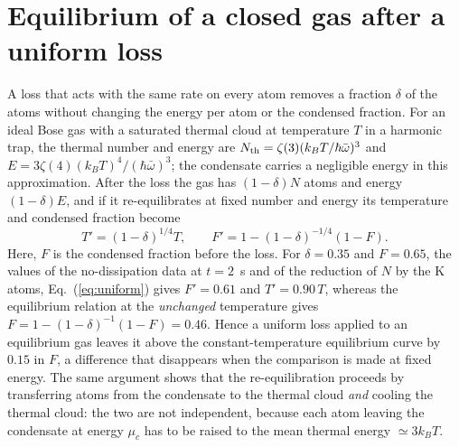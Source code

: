 \appendix
\section{Equilibrium of a closed gas after a uniform loss}
\label{app:uniform}
A loss that acts with the same rate on every atom removes a fraction $\delta$
of the atoms without changing the energy per atom or the condensed fraction.
For an ideal Bose gas with a saturated thermal cloud at temperature $T$ in a
harmonic trap, the thermal number and energy are
$N_{\rm th}=\zeta(3)(k_BT/\hbar\bar\omega)^3$ and
$E=3\zeta(4)(k_BT)^4/(\hbar\bar\omega)^3$; the condensate carries a negligible
energy in this approximation. After the loss the gas has $(1-\delta)N$ atoms
and energy $(1-\delta)E$, and if it re-equilibrates at fixed number and energy
its temperature and condensed fraction become
\begin{equation}
T'=(1-\delta)^{1/4}T,\qquad F'=1-(1-\delta)^{-1/4}(1-F).
\label{eq:uniform}
\end{equation}
Here, $F$ is the condensed fraction before the loss. For $\delta=0.35$ and
$F=0.65$, the values of the no-dissipation data at $t=2$~s and of the
reduction of $N$ by the K atoms, Eq.~(\ref{eq:uniform}) gives $F'=0.61$ and
$T'=0.90\,T$, whereas the equilibrium relation at the \emph{unchanged}
temperature gives $F=1-(1-\delta)^{-1}(1-F)=0.46$. Hence a uniform loss
applied to an equilibrium gas leaves it above the constant-temperature
equilibrium curve by $0.15$ in $F$, a difference that disappears when the
comparison is made at fixed energy. The same argument shows that the
re-equilibration proceeds by transferring atoms from the condensate to the
thermal cloud \emph{and} cooling the thermal cloud: the two are not
independent, because each atom leaving the condensate at energy $\mu_c$ has to
be raised to the mean thermal energy $\simeq3k_BT$.
